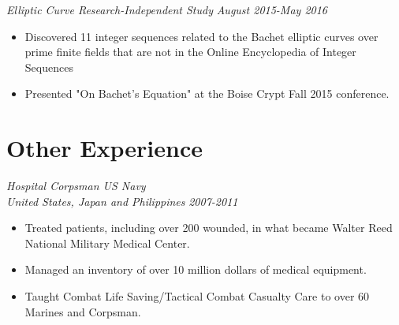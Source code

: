 \documentclass[letterpaper]{article}
\begin{document}
\vspace{.06in}
\begin{multicols}{2}
\textit{Elliptic Curve Research-Independent Study}
\vfill
\columnbreak
\textit{August 2015-May 2016}
\end{multicols}
\begin{itemize}
    \item Discovered 11 integer sequences related to the Bachet elliptic curves over prime finite fields that are not in the Online Encyclopedia of Integer Sequences
    \item Presented "On Bachet's Equation" at the Boise Crypt Fall 2015 conference.
\end{itemize}

\section*{Other Experience}
\begin{multicols}{2}
\textit{Hospital Corpsman US Navy
\\United States, Japan and Philippines}
\vfill
\columnbreak
\textit{2007-2011}
\end{multicols}
\begin{itemize}
    \item Treated patients, including over 200 wounded, in what became Walter Reed National Military Medical Center.
    \item Managed an inventory of over 10 million dollars of medical equipment.
    \item Taught Combat Life Saving/Tactical Combat Casualty Care to over 60 Marines and Corpsman. 
\end{itemize}

\end{document}
